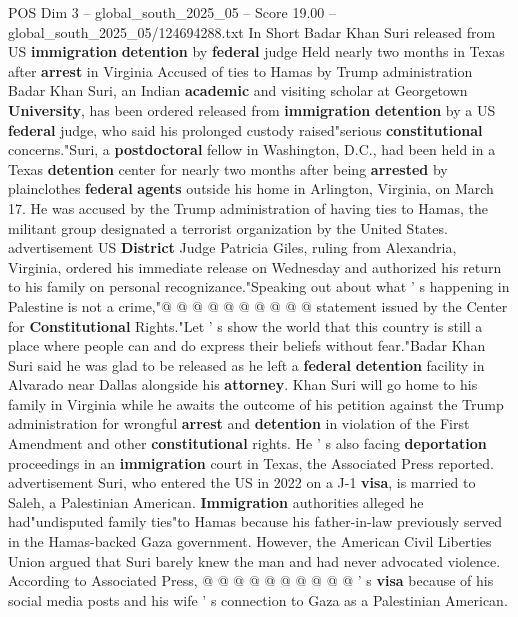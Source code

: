 \begin{textsample}{POS Dim 3 – global\_south\_2025\_05 – Score 19.00 – global\_south\_2025\_05/124694288.txt}  \label{ex:f3_pos_284}
In Short Badar Khan Suri released from US \textbf{immigration} \textbf{detention} by \textbf{federal} judge Held nearly two months in Texas after \textbf{arrest} in Virginia Accused of ties to Hamas by Trump administration Badar Khan Suri, an Indian \textbf{academic} and visiting scholar at Georgetown \textbf{University}, has been ordered released from \textbf{immigration} \textbf{detention} by a US \textbf{federal} judge, who said his prolonged custody raised"serious \textbf{constitutional} concerns."Suri, a \textbf{postdoctoral} fellow in Washington, D.C., had been held in a Texas \textbf{detention} center for nearly two months after being \textbf{arrested} by plainclothes \textbf{federal} \textbf{agents} outside his home in Arlington, Virginia, on March 17.
He was accused by the Trump administration of having ties to Hamas, the militant group designated a terrorist organization by the United States. advertisement US \textbf{District} Judge Patricia Giles, ruling from Alexandria, Virginia, ordered his immediate release on Wednesday and authorized his return to his family on personal recognizance."Speaking out about what ' s happening in Palestine is not a crime,"@ @ @ @ @ @ @ @ @ @ statement issued by the Center for \textbf{Constitutional} Rights."Let ' s show the world that this country is still a place where people can and do express their beliefs without fear."Badar Khan Suri said he was glad to be released as he left a \textbf{federal} \textbf{detention} facility in Alvarado near Dallas alongside his \textbf{attorney}.
Khan Suri will go home to his family in Virginia while he awaits the outcome of his petition against the Trump administration for wrongful \textbf{arrest} and \textbf{detention} in violation of the First Amendment and other \textbf{constitutional} rights.
He ' s also facing \textbf{deportation} proceedings in an \textbf{immigration} court in Texas, the Associated Press reported. advertisement Suri, who entered the US in 2022 on a J-1 \textbf{visa}, is married to Saleh, a Palestinian American. \textbf{Immigration} authorities alleged he had"undisputed family ties"to Hamas because his father-in-law previously served in the Hamas-backed Gaza government.
However, the American Civil Liberties Union argued that Suri barely knew the man and had never advocated violence.
According to Associated Press, @ @ @ @ @ @ @ @ @ @ ' s \textbf{visa} because of his social media posts and his wife ' s connection to Gaza as a Palestinian American.

\end{textsample}
